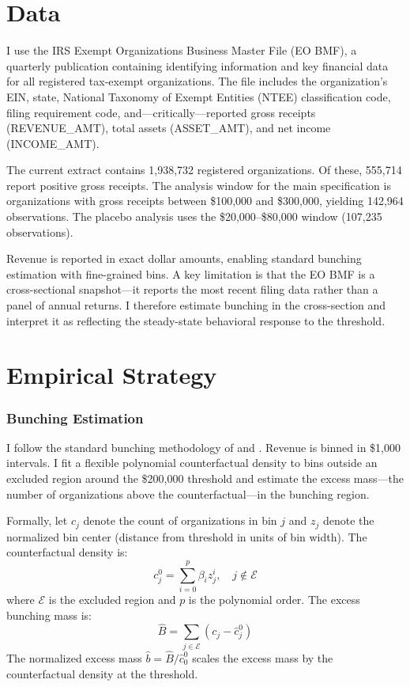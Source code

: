 \documentclass[12pt]{article}
\begin{document}
\section{Data}

I use the IRS Exempt Organizations Business Master File (EO BMF), a quarterly publication containing identifying information and key financial data for all registered tax-exempt organizations. The file includes the organization's EIN, state, National Taxonomy of Exempt Entities (NTEE) classification code, filing requirement code, and---critically---reported gross receipts (REVENUE\_AMT), total assets (ASSET\_AMT), and net income (INCOME\_AMT).

The current extract contains 1,938,732 registered organizations. Of these, 555,714 report positive gross receipts. The analysis window for the main specification is organizations with gross receipts between \$100,000 and \$300,000, yielding 142,964 observations. The placebo analysis uses the \$20,000--\$80,000 window (107,235 observations).

Revenue is reported in exact dollar amounts, enabling standard bunching estimation with fine-grained bins. A key limitation is that the EO BMF is a cross-sectional snapshot---it reports the most recent filing data rather than a panel of annual returns. I therefore estimate bunching in the cross-section and interpret it as reflecting the steady-state behavioral response to the threshold.



\section{Empirical Strategy}

\subsubsection*{Bunching Estimation} I follow the standard bunching methodology of \citet{saez2010taxpayers} and \citet{kleven2016bunching}. Revenue is binned in \$1,000 intervals. I fit a flexible polynomial counterfactual density to bins outside an excluded region around the \$200,000 threshold and estimate the excess mass---the number of organizations above the counterfactual---in the bunching region.

Formally, let $c_j$ denote the count of organizations in bin $j$ and $z_j$ denote the normalized bin center (distance from threshold in units of bin width). The counterfactual density is:
\begin{equation}
  c_j^0 = \sum_{i=0}^{p} \beta_i z_j^i, \quad j \notin \mathcal{E}
\end{equation}
where $\mathcal{E}$ is the excluded region and $p$ is the polynomial order. The excess bunching mass is:
\begin{equation}
  \hat{B} = \sum_{j \in \mathcal{E}} \left( c_j - \hat{c}_j^0 \right)
\end{equation}
The normalized excess mass $\hat{b} = \hat{B} / \hat{c}_0^0$ scales the excess mass by the counterfactual density at the threshold.
\end{document}

